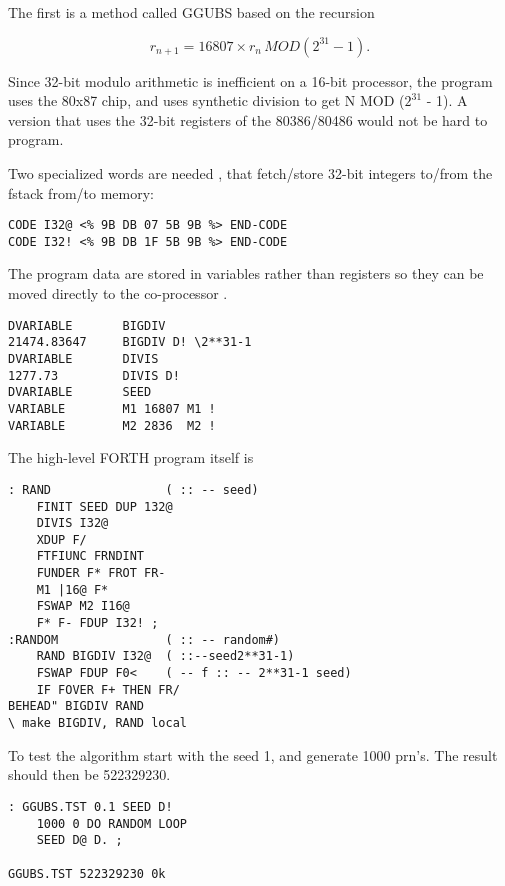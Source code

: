 The first is a method called GGUBS  based on the recursion

\begin{equation}
    r_{n+1} = 16807 \times{} r_n \, MOD (2^{31} - 1) .\nonumber
\end{equation}

Since 32-bit modulo arithmetic is inefficient on a 16-bit processor, the
program uses the 80x87 chip, and uses synthetic division
to get N MOD ($2^{31}$ - 1). A version that uses the 32-bit registers
of the 80386/80486 would not be hard to program.

Two specialized words are needed 
, that fetch/store 32-bit integers to/from the fstack from/to memory:

\begin{verbatim}
CODE I32@ <% 9B DB 07 5B 9B %> END-CODE
CODE I32! <% 9B DB 1F 5B 9B %> END-CODE
\end{verbatim}

The program data are stored in variables rather than registers so
they can be moved directly to the co-processor  .

\begin{verbatim}
DVARIABLE       BIGDIV
21474.83647     BIGDIV D! \2**31-1
DVARIABLE       DIVIS
1277.73         DIVIS D!
DVARIABLE       SEED
VARIABLE        M1 16807 M1 !
VARIABLE        M2 2836  M2 !
\end{verbatim}

The high-level FORTH program itself is

\begin{verbatim}
: RAND                ( :: -- seed)
    FINIT SEED DUP 132@
    DIVIS I32@
    XDUP F/
    FTFIUNC FRNDINT
    FUNDER F* FROT FR-
    M1 |16@ F*
    FSWAP M2 I16@
    F* F- FDUP I32! ;
:RANDOM               ( :: -- random#)
    RAND BIGDIV I32@  ( ::--seed2**31-1)
    FSWAP FDUP F0<    ( -- f :: -- 2**31-1 seed)
    IF FOVER F+ THEN FR/
BEHEAD" BIGDIV RAND
\ make BIGDIV, RAND local

\end{verbatim}
To test the algorithm start with the seed 1, and generate 1000
prn's. The result should then be 522329230.

\begin{verbatim}
: GGUBS.TST 0.1 SEED D!
    1000 0 DO RANDOM LOOP
    SEED D@ D. ;

GGUBS.TST 522329230 0k
\end{verbatim}

